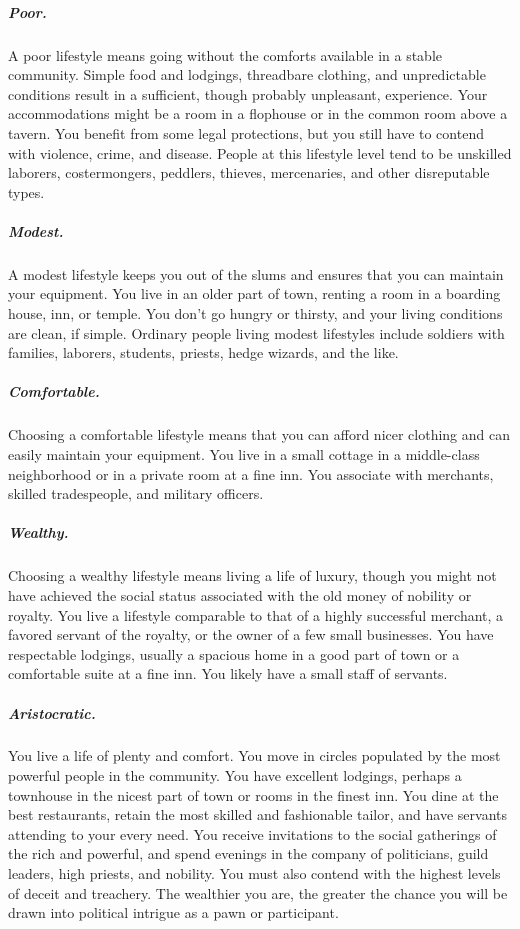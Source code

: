 \subparagraph*{Poor.} A poor lifestyle means going without the comforts available in a stable community. Simple food and lodgings, threadbare clothing, and unpredictable conditions result in a sufficient, though probably unpleasant, experience. Your accommodations might be a room in a flophouse or in the common room above a tavern. You benefit from some legal protections, but you still have to contend with violence, crime, and disease. People at this lifestyle level tend to be unskilled laborers, costermongers, peddlers, thieves, mercenaries, and other disreputable types.

\subparagraph*{Modest.} A modest lifestyle keeps you out of the slums and ensures that you can maintain your equipment. You live in an older part of town, renting a room in a boarding house, inn, or temple. You don't go hungry or thirsty, and your living conditions are clean, if simple. Ordinary people living modest lifestyles include soldiers with families, laborers, students, priests, hedge wizards, and the like.

\subparagraph*{Comfortable.} Choosing a comfortable lifestyle means that you can afford nicer clothing and can easily maintain your equipment. You live in a small cottage in a middle-class neighborhood or in a private room at a fine inn. You associate with merchants, skilled tradespeople, and military officers.

\subparagraph*{Wealthy.} Choosing a wealthy lifestyle means living a life of luxury, though you might not have achieved the social status associated with the old money of nobility or royalty. You live a lifestyle comparable to that of a highly successful merchant, a favored servant of the royalty, or the owner of a few small businesses. You have respectable lodgings, usually a spacious home in a good part of town or a comfortable suite at a fine inn. You likely have a small staff of servants.

\subparagraph*{Aristocratic.} You live a life of plenty and comfort. You move in circles populated by the most powerful people in the community. You have excellent lodgings, perhaps a townhouse in the nicest part of town or rooms in the finest inn. You dine at the best restaurants, retain the most skilled and fashionable tailor, and have servants attending to your every need. You receive invitations to the social gatherings of the rich and powerful, and spend evenings in the company of politicians, guild leaders, high priests, and nobility. You must also contend with the highest levels of deceit and treachery. The wealthier you are, the greater the chance you will be drawn into political intrigue as a pawn or participant.


